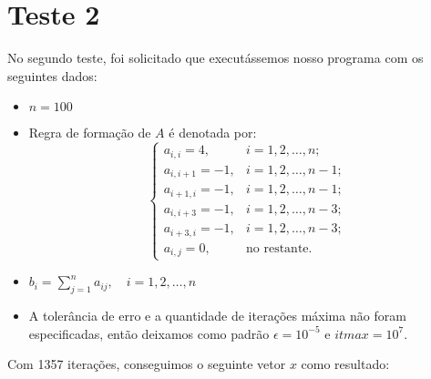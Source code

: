 \section{Teste 2}
No segundo teste, foi solicitado que executássemos nosso programa com os seguintes dados:

	\begin{itemize}
		\item \(n = 100\)
		\item Regra de formação de \(A\) é denotada por:
		\[
			\begin{cases}
				a_{i,i} = 4,	& i = 1, 2, \ldots, n;\\
				a_{i,i+1} = -1,	& i = 1, 2, \ldots, n-1;\\
				a_{i+1,i} = -1,	& i = 1, 2, \ldots, n-1;\\
				a_{i,i+3} = -1,	& i = 1, 2, \ldots, n-3;\\
				a_{i+3,i} = -1,	& i = 1, 2, \ldots, n-3;\\
				a_{i,j} = 0,	& \mbox{no restante.}
			\end{cases}
		\]
		\item \(b_{i} = \sum_{j=1}^{n} a_{ij}, \quad i = 1, 2, \ldots, n\)
		\item A tolerância de erro e a quantidade de iterações máxima não foram especificadas,
			então deixamos como padrão \(\epsilon = 10^{-5}\) e \(itmax = 10^{7}\).
	\end{itemize}
Com 1357 iterações, conseguimos o seguinte vetor \(x\) como resultado:
